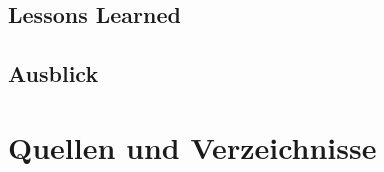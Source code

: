 \documentclass[11pt]{article} %
\begin{document}
\subsection{Lessons Learned}
\subsection{Ausblick}


\newpage
\section{Quellen und Verzeichnisse}


\newpage
\listoffigures
{}
\newpage
\listoftables
{}
\newpage
\listoflistings
{}


\newpage
\pagestyle{headings}
\appendix
\setcounter{figure}{0}
\setcounter{table}{0}
\renewcommand{\thefigure}{\thesection\arabic{figure}}
\renewcommand{\thetable}{\thesection\arabic{table}}
\renewcommand{\thesubsection}{\thesection\arabic{subsection}}



\end{document}
